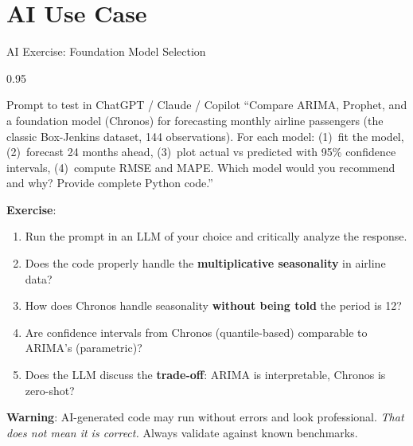 \documentclass[9pt, aspectratio=169, t]{beamer}
\begin{document}
\section{AI Use Case}

\begin{frame}{AI Exercise: Foundation Model Selection}
    \begin{cminipage}{0.95\textwidth}
    \vspace{-3mm}
    \begin{block}{\footnotesize Prompt to test in ChatGPT / Claude / Copilot}
        {\footnotesize
        ``Compare ARIMA, Prophet, and a foundation model (Chronos) for forecasting monthly airline passengers (the classic Box-Jenkins dataset, 144 observations). For each model: (1)~fit the model, (2)~forecast 24 months ahead, (3)~plot actual vs predicted with 95\% confidence intervals, (4)~compute RMSE and MAPE. Which model would you recommend and why? Provide complete Python code.''
        }
    \end{block}
    \vspace{-2mm}
    {\footnotesize
    \textbf{Exercise}:
    \begin{enumerate}\setlength{\itemsep}{0pt}
        \item Run the prompt in an LLM of your choice and critically analyze the response.
        \item Does the code properly handle the \textbf{multiplicative seasonality} in airline data?
        \item How does Chronos handle seasonality \textbf{without being told} the period is 12?
        \item Are confidence intervals from Chronos (quantile-based) comparable to ARIMA's (parametric)?
        \item Does the LLM discuss the \textbf{trade-off}: ARIMA is interpretable, Chronos is zero-shot?
    \end{enumerate}
    }
    \vspace{-2mm}
    \begin{alertblock}{}
        {\footnotesize \textbf{Warning}: AI-generated code may run without errors and look professional. \textit{That does not mean it is correct.} Always validate against known benchmarks.}
    \end{alertblock}
    \end{cminipage}
\end{frame}
\end{document}
